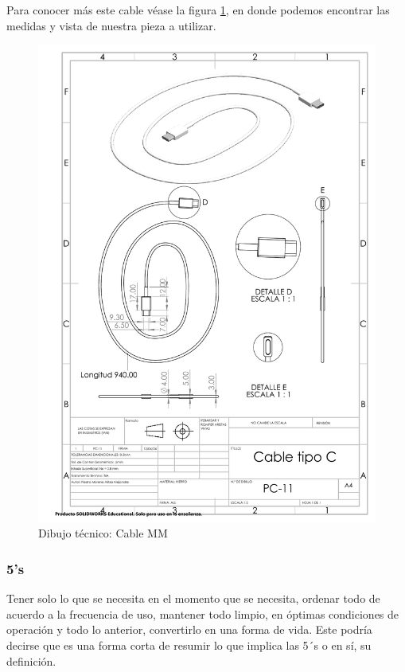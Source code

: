     Para conocer más este cable véase la figura \ref{fig:cableC}, en donde podemos encontrar las medidas y vista de nuestra pieza a utilizar. 
    
    \begin{figure}[H]
        \centering
        \includegraphics[trim = {25mm 67mm 25mm 88mm},clip,scale=0.4]{22/Img/cableCDibujo.PDF}
        \caption{Dibujo técnico: Cable MM}
        \label{fig:cableC}
    \end{figure}
    
    
    
    \subsubsection{5's}
    
    Tener solo lo que se necesita en el momento que se necesita, ordenar todo de acuerdo a la frecuencia de uso, mantener todo limpio,  en óptimas condiciones de operación y todo lo anterior, convertirlo en una forma de vida. Este podría decirse que es una forma corta de resumir lo que implica las 5´s o en sí, su definición.
    
